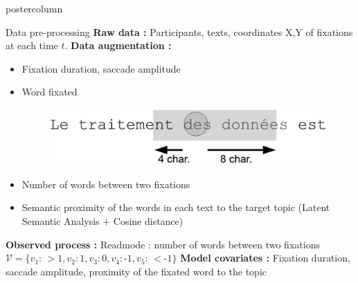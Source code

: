 \documentclass[final,hyperref={pdfpagelabels=false}]{beamer}
\begin{document}
\begin{frame}
\begin{columns}
\begin{column}{.50\textwidth}
\begin{beamercolorbox}[center,wd=\textwidth]{postercolumn}
\begin{minipage}[T]{.98\textwidth}
{            \vfill
            \begin{block}{Data pre-processing}
                \textbf{Raw data :} Participants, texts, coordinates X,Y of fixations at each time $t$.
                \vskip0.5cm
                \textbf{Data augmentation :}
                \begin{itemize}
                    \item[\bullet] Fixation duration, saccade amplitude
                    \item[\bullet]
                    \begin{minipage}{0.45\textwidth}
                        Word fixated
                    \end{minipage}
                    \begin{minipage}{0.35\textwidth}
                        \begin{figure}[H]
                            \includegraphics[width=1\linewidth]{fixation_window.jpg}
                        \end{figure}
                    \end{minipage}
                    \item[\bullet] Number of words between two fixations
                    \item[\bullet] Semantic proximity of the words in each text to the target topic (Latent Semantic Analysis + Cosine distance)
                \end{itemize}
                \vskip0.5cm
                \textbf{Observed process :} Readmode :  number of words between two fixations
                $\mathcal{V} =\{ v_1:\,> \text{1}, v_2: \text{1}, v_3: \text{0}, v_4: \text{-1}, v_5 :\,< \text{-1}\} $
                \vskip0.5cm
                \textbf{Model covariates :} Fixation duration, saccade amplitude, proximity of the fixated word to the topic


\end{block}}
\end{minipage}
\end{beamercolorbox}
\end{column}
\end{columns}
\end{frame}
\end{document}
